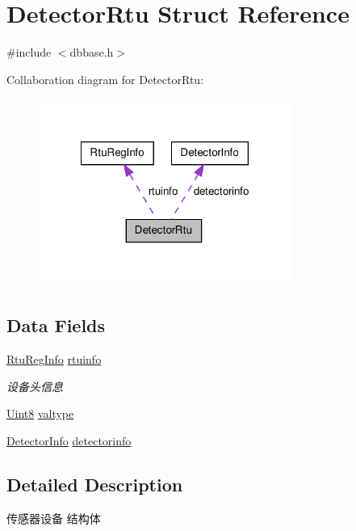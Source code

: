 \hypertarget{structDetectorRtu}{\section{Detector\-Rtu Struct Reference}
\label{structDetectorRtu}
}


{\ttfamily \#include $<$dbbase.\-h$>$}



Collaboration diagram for Detector\-Rtu\-:\nopagebreak
\begin{figure}[H]
\begin{center}
\leavevmode
\includegraphics[width=236pt]{structDetectorRtu__coll__graph}
\end{center}
\end{figure}
\subsection*{Data Fields}
\begin{DoxyCompactItemize}
\item 
\hyperlink{structRtuRegInfo}{Rtu\-Reg\-Info} \hyperlink{structDetectorRtu_a0cc8bb5f4b4f63380fabd7d7e6c82849}{rtuinfo}
\begin{DoxyCompactList}\small\item\em 设备头信息 \end{DoxyCompactList}\item 
\hyperlink{base_8h_af84840501dec18061d18a68c162a8fa2}{Uint8} \hyperlink{structDetectorRtu_a0b30b25acdbd4d7dc62ac9b50daf64f0}{valtype}
\item 
\hyperlink{structDetectorInfo}{Detector\-Info} \hyperlink{structDetectorRtu_a2d98ee3ad1fe130208268ee868dc5dab}{detectorinfo}
\end{DoxyCompactItemize}


\subsection{Detailed Description}
传感器设备 结构体 

